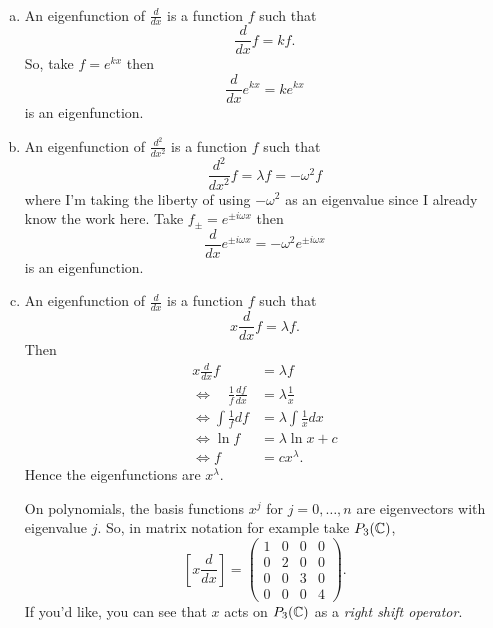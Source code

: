 \documentclass[12pt]{article} %
\begin{document}
\begin{solution}~
\begin{enumerate}[(a)]
\item An eigenfunction of $\frac{d}{dx}$ is a function $f$ such that
\[
\frac{d}{dx} f = k f.
\]
So, take $f=e^{kx}$ then
\[
\frac{d}{dx} e^{kx} = k e^{kx}
\]
is an eigenfunction.
\item An eigenfunction of $\frac{d^2}{dx^2}$ is a function $f$ such that
\[
\frac{d^2}{dx^2} f = \lambda f = -\omega^2 f
\]
where I'm taking the liberty of using $-\omega^2$ as an eigenvalue since I already know the work here. Take $f_\pm=e^{\pm i\omega x}$ then
\[
\frac{d}{dx} e^{\pm i\omega x} = -\omega^2 e^{\pm i \omega x}
\]
is an eigenfunction.
\item An eigenfunction of $\frac{d}{dx}$ is a function $f$ such that
\[
x\frac{d}{dx} f = \lambda f.
\]
Then
\begin{align*}
    x\frac{d}{dx} f &= \lambda f\\
\iff \quad \frac{1}{f}\frac{df}{dx}  &= \lambda \frac{1}{x}\\
\iff \int \frac{1}{f} df &= \lambda \int \frac{1}{x} dx\\
\iff \ln f & = \lambda \ln x + c\\
\iff f &= c x^\lambda.
\end{align*}
Hence the eigenfunctions are $x^\lambda$.
\begin{remark}
On polynomials, the basis functions $x^j$ for $j=0,\dots, n$ are eigenvectors with eigenvalue $j$. So, in matrix notation for example take $P_3 (\mathbb{C})$,
\[
\left[ x \frac{d}{dx} \right] = \begin{pmatrix} 1 & 0 & 0 & 0  \\ 0 & 2 & 0 & 0 \\ 0 & 0 & 3 & 0  \\ 0 & 0 & 0 & 4 \end{pmatrix}.
\]
If you'd like, you can see that $x$ acts on $P_3(\mathbb{C})$ as a \emph{right shift operator}.
\end{remark}
\end{enumerate}
\end{solution}
\end{document}
